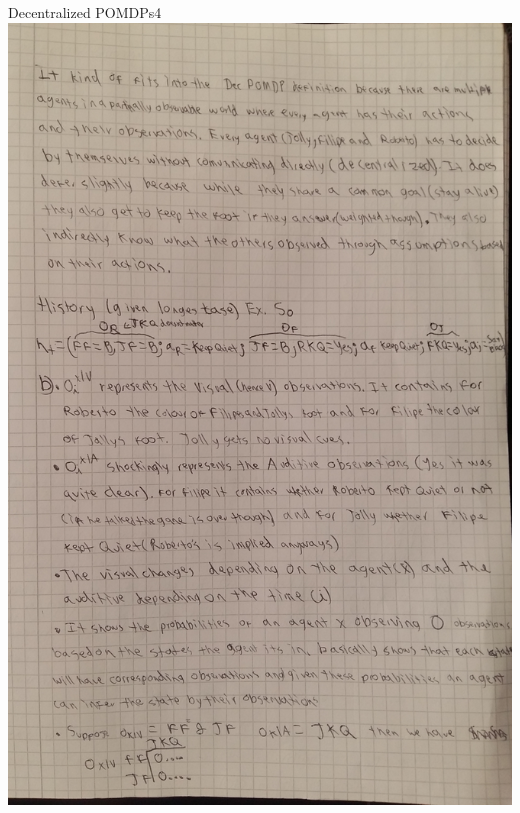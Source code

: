 \begin{questions}
\begin{question}{Decentralized POMDPs}{4}
	\includegraphics[scale=0.2]{p3.jpg}	
		\newpage


\end{question}
\end{questions}
